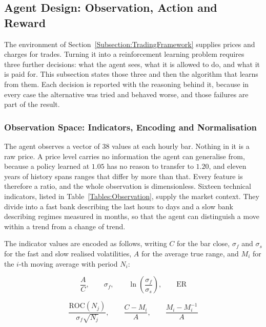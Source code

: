 \subsection{Agent Design: Observation, Action and Reward}
\label{Subsection:AgentDesign}

The environment of Section~\ref{Subsection:TradingFramework} supplies prices and charges for trades. Turning it into a reinforcement learning problem requires three further decisions: what the agent sees, what it is allowed to do, and what it is paid for. This subsection states those three and then the algorithm that learns from them. Each decision is reported with the reasoning behind it, because in every case the alternative was tried and behaved worse, and those failures are part of the result.

\subsubsection{Observation Space: Indicators, Encoding and Normalisation}

The agent observes a vector of $38$ values at each hourly bar. Nothing in it is a raw price. A price level carries no information the agent can generalise from, because a policy learned at $1.05$ has no reason to transfer to $1.20$, and eleven years of history spans ranges that differ by more than that. Every feature is therefore a ratio, and the whole observation is dimensionless. Sixteen technical indicators, listed in Table~\ref{Tables:Observation}, supply the market context. They divide into a fast bank describing the last hours to days and a slow bank describing regimes measured in months, so that the agent can distinguish a move within a trend from a change of trend.



The indicator values are encoded as follows, writing $C$ for the bar close, $\sigma_f$ and $\sigma_s$ for the fast and slow realised volatilities, $A$ for the average true range, and $M_i$ for the $i$-th moving average with period $N_i$:

\begin{equation}
\frac{A}{C}, \qquad \sigma_f, \qquad \ln\!\left(\frac{\sigma_f}{\sigma_s}\right), \qquad \text{ER}
\label{Equation:VolatilityFeatures}
\end{equation}

\begin{equation}
\frac{\text{ROC}(N_j)}{\sigma_f \sqrt{N_j}}, \qquad \frac{C - M_i}{A}, \qquad \frac{M_i - M_i^{-1}}{A}
\label{Equation:TrendFeatures}
\end{equation}

